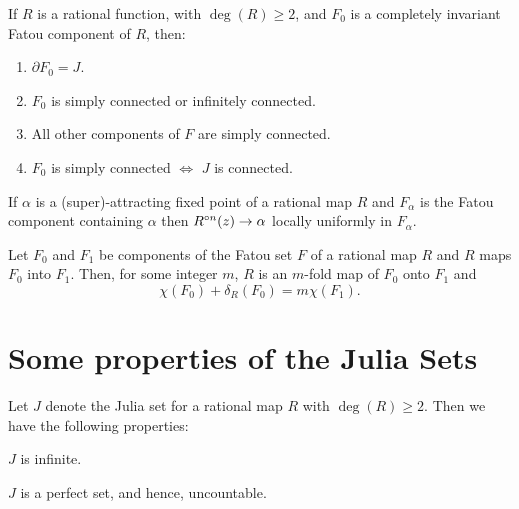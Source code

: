 \begin{theorem}\label{thm1.2}
	If \( R \) is a rational function, with \( \deg(R)\ge 2 \), and \( F_0 \) is
	a completely invariant Fatou component of \( R \), then:
	\begin{enumerate}
		\item \( \partial F_0=J \).
		\item \( F_0 \) is simply connected or infinitely connected.
		\item All other components of \( F \) are simply connected.
		\item \( F_0 \) is simply connected \( \iff \) \( J \) is connected.
	\end{enumerate}
\end{theorem}


\begin{theorem}

\end{theorem}

\begin{lemma}\label{lem1.2}
	If \( \alpha \) is a (super)-attracting fixed point of a rational map \( R \) and \( F_\alpha \) is the
	Fatou component containing \( \alpha \) then \( \ror[n](z)\to \alpha \)
	locally uniformly in \( F_\alpha \).
\end{lemma}

\begin{theorem}
	Let \( F_0 \) and \( F_1 \) be components of the Fatou set \( F \) of a rational map \( R \)
	and \( R \) maps \( F_0 \) into \( F_1 \). Then, for some integer \( m \), \( R \) is an \( m \)-fold
	map of \( F_0 \) onto \( F_1 \) and \[
		\chi(F_0)+\delta_R(F_0)=m\chi(F_1)
	.\] 
\end{theorem}

\section{Some properties of the Julia Sets}
Let \( J \) denote the Julia set for a rational map \( R \) with \( \deg(R)\ge 2 \). Then we have the following properties:
\begin{theorem} 
	\( J \) is infinite.
\end{theorem}

\begin{theorem}
	
\end{theorem}

\begin{theorem}
	\( J \) is a perfect set, and hence, uncountable.
\end{theorem}
